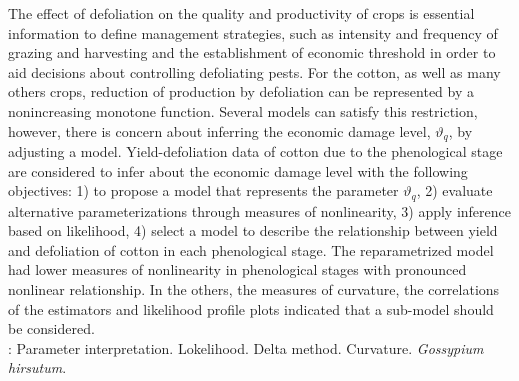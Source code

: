 The effect of defoliation on the quality and productivity of crops is
essential information to define management strategies, such as
intensity and frequency of grazing and harvesting and the
establishment of economic threshold in order to aid decisions about
controlling defoliating pests. For the cotton, as well as many others
crops, reduction of production by defoliation can be represented by a
nonincreasing monotone function. Several models can satisfy this
restriction, however, there is concern about inferring the economic
damage level, $\vartheta_q$, by adjusting a model. Yield-defoliation
data of cotton due to the phenological stage are considered to infer
about the economic damage level with the following objectives: 1) to
propose a model that represents the parameter $\vartheta_q$, 2)
evaluate alternative parameterizations through measures of
nonlinearity, 3) apply inference based on likelihood, 4) select a
model to describe the relationship between yield and defoliation of
cotton in each phenological stage. The reparametrized model had lower
measures of nonlinearity in phenological stages with pronounced
nonlinear relationship. In the others, the measures of curvature, the
correlations of the estimators and likelihood profile plots indicated
that a sub-model should be considered.\\
\newline
{}: Parameter interpretation. Lokelihood. Delta method. Curvature. \emph{Gossypium hirsutum}.
